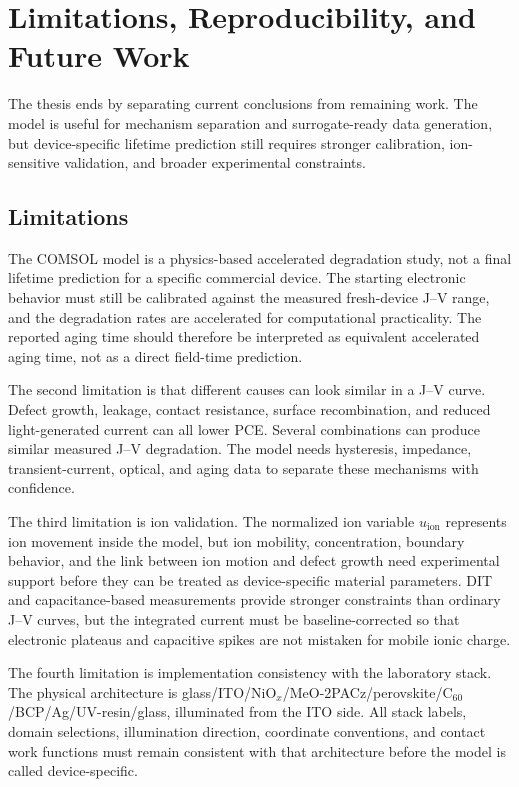 \chapter{Limitations, Reproducibility, and Future Work}

The thesis ends by separating current conclusions from remaining work. The
model is useful for mechanism separation and surrogate-ready data generation,
but device-specific lifetime prediction still requires stronger calibration,
ion-sensitive validation, and broader experimental constraints.

\section{Limitations}

The COMSOL model is a physics-based accelerated degradation study, not a final
lifetime prediction for a specific commercial device. The
starting electronic behavior must still be calibrated against the measured
fresh-device J--V range, and the degradation rates are accelerated for
computational practicality. The reported aging time should therefore be
interpreted as equivalent accelerated aging time, not as a direct field-time
prediction.

The second limitation is that different causes can look similar in a J--V
curve. Defect growth, leakage, contact resistance, surface recombination, and
reduced light-generated current can all lower PCE. Several combinations can
produce similar measured J--V degradation. The model needs hysteresis, impedance,
transient-current, optical, and aging data to separate these mechanisms with
confidence.

The third limitation is ion validation. The normalized ion variable
$u_{\mathrm{ion}}$ represents ion movement inside the model, but ion mobility,
concentration, boundary behavior, and the link between ion motion and defect
growth need
experimental support before they can be treated as device-specific
material parameters. DIT and capacitance-based measurements provide stronger
constraints than ordinary J--V curves, but the integrated current must be
baseline-corrected so that electronic plateaus and capacitive spikes are not
mistaken for mobile ionic charge.

The fourth limitation is implementation consistency with the laboratory stack.
The physical architecture is
glass/ITO/NiO$_x$/MeO-2PACz/perovskite/C$_{60}$/BCP/Ag/UV-resin/glass,
illuminated from the ITO side. All stack labels, domain selections,
illumination direction, coordinate conventions, and contact work functions must
remain consistent with that architecture before the model is called
device-specific.

